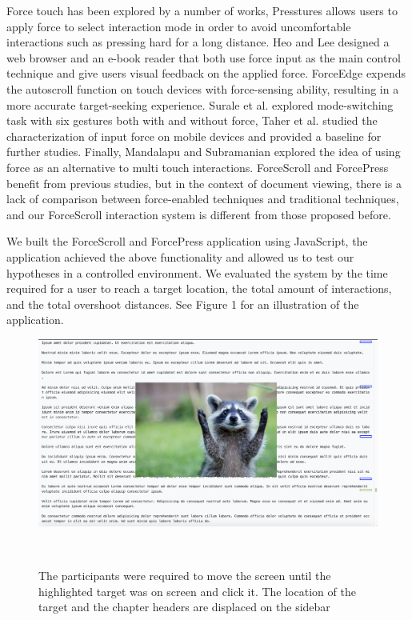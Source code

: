 \documentclass{sigchi}
\begin{document}
Force touch has been explored by a number of works, Presstures \cite{rendl2014presstures} allows users to apply force to select interaction mode in order to avoid uncomfortable interactions such as pressing hard for a long distance. Heo and Lee \cite{heo2011force} designed a web browser and an e-book reader that both use force input as the main control technique and give users visual feedback on the applied force. ForceEdge \cite{antoine2017forceedge} expends the autoscroll function on touch devices with force-sensing ability, resulting in a more accurate target-seeking experience. Surale et al. \cite{surale2017experimental} explored mode-switching task with six gestures both with and without force, Taher et al. \cite{taher2014empirical} studied the characterization of input force on mobile devices and provided a baseline for further studies. Finally, Mandalapu and Subramanian \cite{mandalapu2011exploring} explored the idea of using force as an alternative to multi touch interactions. ForceScroll and ForcePress benefit from previous studies, but in the context of document viewing, there is a lack of comparison between force-enabled techniques and traditional techniques, and our ForceScroll interaction system is different from those proposed before.          


We built the ForceScroll and ForcePress application using JavaScript, the application achieved the above functionality and allowed us to test our hypotheses in a controlled environment. We evaluated the system by the time required for a user to reach a target location, the total amount of interactions, and the total overshoot distances. See Figure 1 for an illustration of the application.  




\begin{figure}[!h]
	\centering
	\includegraphics[width=0.9\columnwidth]{figures/Capture}
	\caption{The participants were required to move the screen until the highlighted target was on screen and click it. The location of the target and the chapter headers are displaced on the sidebar}~\label{fig:figure1}
\end{figure}
\end{document}
